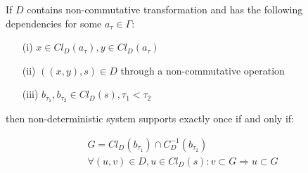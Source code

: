 \begin{theorem}
\label{necessary_conditions}
If $D$ contains non-commutative transformation and has the following dependencies for some $a_\tau \in \Gamma$:

\begin{enumerate}
  \item[(i)] $x \in Cl_D(a_\tau), y \in Cl_D(a_\tau)$
  \item[(ii)] $((x,y),s)\in D$ through a non-commutative operation
  \item[(iii)] $b_{\tau_1}, b_{\tau_2} \in Cl_D(s), \tau_1 < \tau_2$
\end{enumerate}

\noindent then non-deterministic system supports exactly once if and only if:

\begin{equation}
\label{theorem_conditions}
  \begin{gathered}
    G = Cl_D(b_{\tau_1}) \cap C_D^{-1}(b_{\tau_2}) \\
    \forall (u, v) \in D, u \in Cl_D(s): v \subset G \Rightarrow u \subset G
  \end{gathered}
\end{equation}

\end{theorem}
